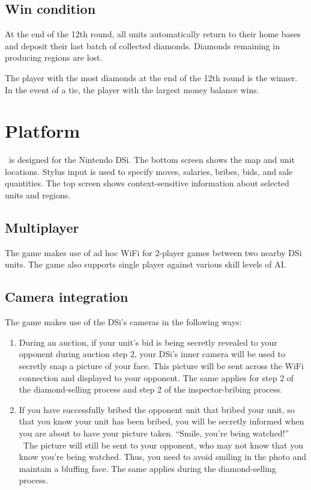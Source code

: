 \subsection{Win condition}
At the end of the 12th round, all units automatically return to their home bases and deposit their last batch of collected diamonds.  Diamonds remaining in producing regions are lost.

The player with the most diamonds at the end of the 12th round is the winner.  In the event of a tie, the player with the largest money balance wins.


\section{Platform}

\gtitle\ is designed for the Nintendo DSi.  The bottom screen shows the map and unit locations.  Stylus input is used to specify moves, salaries, bribes, bids, and sale quantities.  The top screen shows context-sensitive information about selected units and regions.

\subsection{Multiplayer}

The game makes use of ad hoc WiFi for 2-player games between two nearby DSi units.  The game also supports single player against various skill levels of AI.

\subsection{Camera integration}
The game makes use of the DSi's cameras in the following ways:
\begin{enumerate}

\item During an auction, if your unit's bid is being secretly revealed to your opponent during auction step 2, your DSi's inner camera will be used to secretly snap a picture of your face.  This picture will be sent across the WiFi connection and displayed to your opponent.  The same applies for step 2 of the diamond-selling process and step 2 of the inspector-bribing process.

\item If you have successfully bribed the opponent unit that bribed your unit, so that you know your unit has been bribed, you will be secretly informed when you are about to have your picture taken.  ``Smile, you're being watched!'' \  The picture will still be sent to your opponent, who may not know that you know you're being watched.  Thus, you need to avoid smiling in the photo and maintain a bluffing face.  The same applies during the diamond-selling process.

\end{enumerate}

